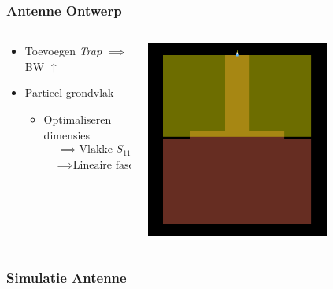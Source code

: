 \documentclass{beamer}
\begin{document}
  \begin{frame}
  \frametitle{Antenne Ontwerp}
  
  \begin{columns}[c]
  \begin{column}{0.5\textwidth}
    \begin{itemize}
      \item Toevoegen \textit{Trap} $\implies$ BW $\uparrow$
      \item Partieel grondvlak
      \begin{itemize}
        \item Optimaliseren dimensies \begin{align} & \implies \text{Vlakke } S_{11} \nonumber \\ & \implies \text{Lineaire fase} \nonumber \end{align}
      \end{itemize}

    \end{itemize}
  \end{column}

  \begin{column}{0.5\textwidth}
  \centering
    \includegraphics[width=0.7\textwidth]{images/antenne_ontwerp.png}
  \end{column}
  \end{columns}
  \end{frame}

  \begin{frame}
  \frametitle{Simulatie Antenne}

  \end{frame}
\end{document}
